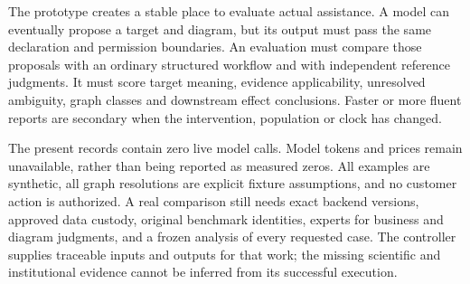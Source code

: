 The prototype creates a stable place to evaluate actual assistance. A model can
eventually propose a target and diagram, but its output must pass the same
declaration and permission boundaries. An evaluation must compare those proposals
with an ordinary structured workflow and with independent reference judgments.
It must score target meaning, evidence applicability, unresolved ambiguity,
graph classes and downstream effect conclusions. Faster or more fluent reports
are secondary when the intervention, population or clock has changed.

The present records contain zero live model calls. Model tokens and prices
remain unavailable, rather than being reported as measured zeros. All examples
are synthetic, all graph resolutions are explicit fixture assumptions, and no
customer action is authorized. A real comparison still needs exact backend
versions, approved data custody, original benchmark identities, experts for
business and diagram judgments, and a frozen analysis of every requested case.
The controller supplies traceable inputs and outputs for that work; the missing
scientific and institutional evidence cannot be inferred from its successful
execution.
